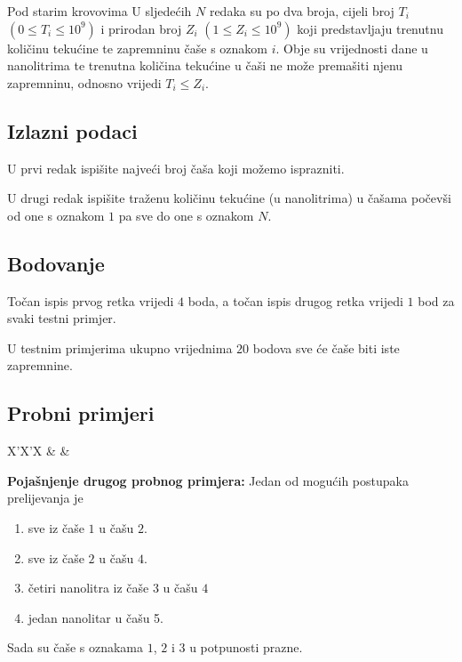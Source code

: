 \begin{statement}[
  problempoints=50,
  timelimit=1 sekunda,
  memorylimit=512 MiB,
]{Pod starim krovovima}
U sljedećih $N$ redaka su po dva broja, cijeli broj $T_i$ $(0 \le T_i \le 10^9)$
i prirodan broj $Z_i$ $(1 \le Z_i \le 10^9)$ koji predstavljaju trenutnu
količinu tekućine te zapremninu čaše s oznakom $i$. Obje su vrijednosti dane
u nanolitrima te trenutna količina tekućine u čaši ne može premašiti njenu
zapremninu, odnosno vrijedi $T_i \le Z_i$.

\subsection*{Izlazni podaci}
U prvi redak ispišite najveći broj čaša koji možemo isprazniti.

U drugi redak ispišite traženu količinu tekućine (u nanolitrima) u čašama
počevši od one s oznakom $1$ pa sve do one s oznakom $N$.

\subsection*{Bodovanje}
Točan ispis prvog retka vrijedi $4$ boda, a točan ispis drugog retka vrijedi $1$
bod za svaki testni primjer.

U testnim primjerima ukupno vrijednima $20$ bodova sve će čaše biti iste
zapremnine.

\subsection*{Probni primjeri}
\begin{tabularx}{\textwidth}{X'X'X}
 &
 &
\end{tabularx}

\textbf{Pojašnjenje drugog probnog primjera:}
Jedan od mogućih postupaka prelijevanja je
\begin{enumerate}
  \item sve iz čaše $1$ u čašu $2$.
  \item sve iz čaše $2$ u čašu $4$.
  \item četiri nanolitra iz čaše $3$ u čašu $4$
  \item jedan nanolitar u čašu 5.
\end{enumerate}
Sada su čaše s oznakama $1$, $2$ i $3$ u potpunosti prazne.

\end{statement}

